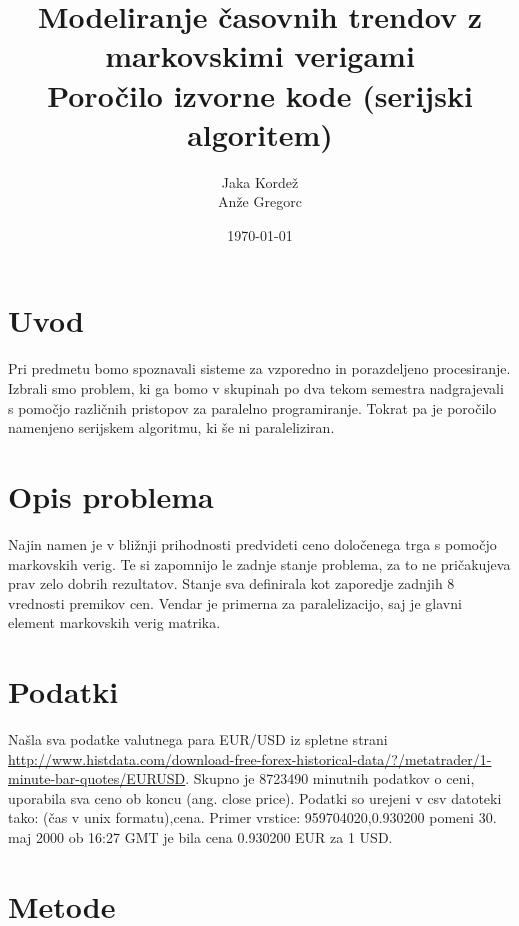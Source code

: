 \documentclass[a4paper,11pt]{article}
\title{Modeliranje časovnih trendov z markovskimi verigami \\ \large  Poročilo izvorne kode (serijski algoritem)}
\author{Jaka Kordež \\ Anže Gregorc}
\date{\today}
\begin{document}
\maketitle

\section{Uvod}

Pri predmetu bomo spoznavali sisteme za vzporedno in porazdeljeno procesiranje. Izbrali smo problem, ki ga bomo v skupinah po dva tekom semestra nadgrajevali s pomočjo različnih pristopov za paralelno programiranje. Tokrat pa je poročilo namenjeno serijskem algoritmu, ki še ni paraleliziran. 

\section{Opis problema}

Najin namen je v bližnji prihodnosti predvideti ceno določenega trga s pomočjo markovskih verig. Te si zapomnijo le zadnje stanje problema, za to ne pričakujeva prav zelo dobrih rezultatov. Stanje sva definirala kot zaporedje zadnjih 8 vrednosti premikov cen. Vendar je primerna za paralelizacijo, saj je glavni element markovskih verig matrika.

\section{Podatki}

Našla sva podatke valutnega para EUR/USD iz spletne strani \url{http://www.histdata.com/download-free-forex-historical-data/?/metatrader/1-minute-bar-quotes/EURUSD}. Skupno je 8723490 minutnih podatkov o ceni, uporabila sva ceno ob koncu (ang. close price). Podatki so urejeni v csv datoteki tako: (čas v unix formatu),cena. Primer vrstice: 959704020,0.930200 pomeni 30. maj 2000 ob 16:27 GMT je bila cena 0.930200 EUR za 1 USD.

\section{Metode}
\end{document}
